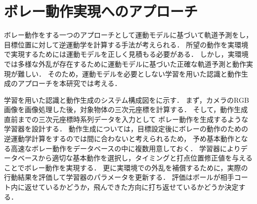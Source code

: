 \documentclass[twocolumn]{preport}
\begin{document}
\section{ボレー動作実現へのアプローチ}
ボレー動作をする一つのアプローチとして運動モデルに基づいて軌道予測をし，目標位置に対して逆運動学を計算する手法が考えられる．
所望の動作を実環境で実現するためには運動モデルを正しく見積もる必要がある．
しかし，実環境では多様な外乱が存在するために運動モデルに基づいた正確な軌道予測と動作実現が難しい．
そのため，運動モデルを必要としない学習を用いた認識と動作生成のアプローチを本研究では考える．

学習を用いた認識と動作生成のシステム構成図をに示す．
まず，カメラのRGB画像を画像処理した後，対象物体の三次元座標を計算する．
そして，動作生成直前までの三次元座標時系列データを入力として
ボレー動作を生成するような学習器を設計する．
動作生成については，目標設定後にボレーの動作のための逆運動学計算をするのでは間に合わないと考えられるため，
予め基本動作となる高速なボレー動作をデータベースの中に複数用意しておく．
学習器によりデータベースから適切な基本動作を選択し，タイミングと打点位置修正値を与えることでボレー動作を実現する．
更に実環境での外乱を補償するために，実際の行動結果を評価して学習器のパラメータを更新する．
評価はボールが相手コート内に返せているかどうか，飛んできた方向に打ち返せているかどうか決定する．
\end{document}
